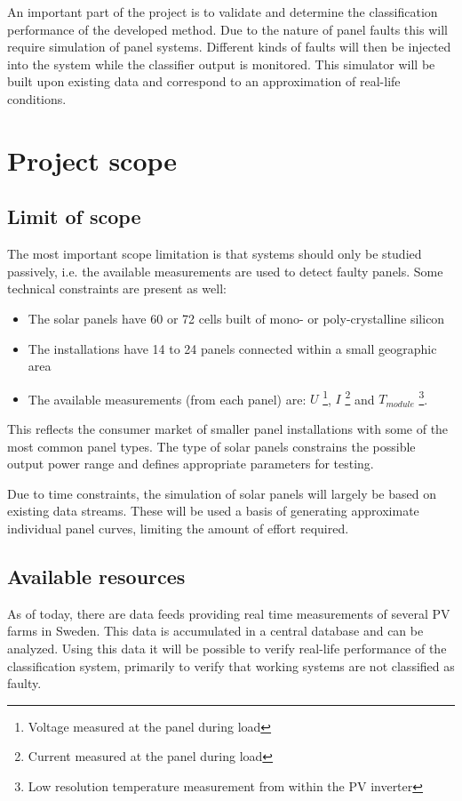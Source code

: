 \documentclass[a4paper,11pt]{article}
\begin{document}
An important part of the project is to validate and determine the classification performance of the developed method.
Due to the nature of panel faults this will require simulation of panel systems.
Different kinds of faults will then be injected into the system while the classifier output is monitored.
This simulator will be built upon existing data and correspond to an approximation of real-life conditions.

\section*{Project scope}
\subsection*{Limit of scope}
The most important scope limitation is that systems should only be studied passively, i.e. the available measurements are used to detect faulty panels.  
Some technical constraints are present as well:
\begin{itemize}
\item The solar panels have 60 or 72 cells built of mono- or poly-crystalline silicon

\item The installations have 14 to 24 panels connected within a small geographic area

\item The available measurements (from each panel) are:
$U$ \footnote{Voltage measured at the panel during load},
$I$ \footnote{Current measured at the panel during load} and
$T_{module}$ \footnote{Low resolution temperature measurement from within the PV inverter}.

\end{itemize}

This reflects the consumer market of smaller panel installations with some of the most common panel types.
The type of solar panels constrains the possible output power range and defines appropriate parameters for testing.

Due to time constraints, the simulation of solar panels will largely be based on existing data streams.
These will be used a basis of generating approximate individual panel curves, limiting the amount of effort required.

\subsection*{Available resources}
As of today, there are data feeds providing real time measurements of several PV farms in Sweden.
This data is accumulated in a central database and can be analyzed.
Using this data it will be possible to verify real-life performance of the classification system, primarily to verify that working systems are not classified as faulty.
\end{document}

